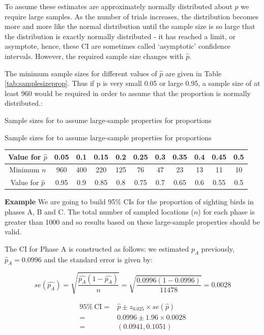 \documentclass[
  oneside]{krantz}
\begin{document}
To assume these estimates are approximately normally distributed about \(p\) we require large samples. As the number of trials increases, the distribution becomes more and more like the normal distribution until the sample size is so large that the distribution is exactly normally distributed - it has reached a limit, or asymptote, hence, these CI are sometimes called `asymptotic' confidence intervals. However, the required sample size changes with \(\hat{p}\).

The minimum sample sizes for different values of \(\hat p\) are given in Table \ref{tab:samplesizeprop}. Thus if p is very small 0.05 or large 0.95, a sample size of at least 960 would be required in order to assume that the proportion is normally distributed.:

\label{tab:samplesizeprop} Sample sizes for to assume large-sample properties for proportions

\begin{table}
\label{samplesizeprop}
\caption{Sample sizes for to assume large-sample properties for proportions}
\end{table}

\begin{longtable}[]{@{}ccccccccccc@{}}
\toprule
Value for \(\hat{p}\) & 0.05 & 0.1 & 0.15 & 0.2 & 0.25 & 0.3 & 0.35 & 0.4 & 0.45 & 0.5\tabularnewline
\midrule
\endhead
Minimum \(n\) & 960 & 400 & 220 & 125 & 76 & 47 & 23 & 13 & 11 & 10\tabularnewline
Value for \(\hat{p}\) & 0.95 & 0.9 & 0.85 & 0.8 & 0.75 & 0.7 & 0.65 & 0.6 & 0.55 & 0.5\tabularnewline
\bottomrule
\end{longtable}

\textbf{Example} We are going to build 95\% CIs for the proportion of sighting birds in phases A, B and C. The total number of sampled locations (\(n\)) for each phase is greater than 1000 and so results based on these large-sample properties should be valid.

The CI for Phase A is constructed as follows: we estimated \(p_A\) previously, \(\hat p_A = 0.0996\) and the standard error is given by:

\[se(\hat{p_A})=\sqrt{\frac{\hat{p_A}(1-\hat{p_A})}{n}}=
          \sqrt{\frac{0.0996(1-0.0996)}{11478}}=  0.0028\]

\begin{align*}
95\%~ \textrm{CI}=&\hat{p} \pm z_{0.025} \times se(\hat{p})\\
=&0.0996 \pm 1.96 \times 0.0028\\
=& (0.0941,0.1051)
\end{align*}
\end{document}
